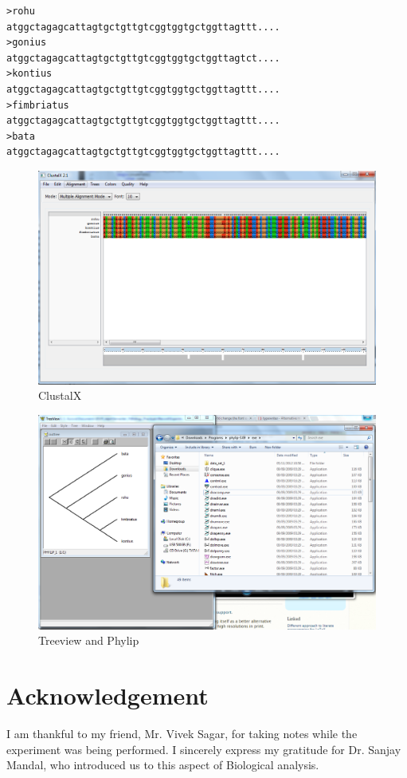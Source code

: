 \begin{lstlisting}[float,caption=Format of the source file,label=tree_sourcefile]
>rohu
atggctagagcattagtgctgttgtcggtggtgctggttagttt....
>gonius
atggctagagcattagtgctgttgtcggtggtgctggttagtct....
>kontius
atggctagagcattagtgctgttgtcggtggtgctggttagttt....
>fimbriatus
atggctagagcattagtgctgttgtcggtggtgctggttagttt....
>bata
atggctagagcattagtgctgttgtcggtggtgctggttagttt....
\end{lstlisting}

\begin{figure}[bth]
	\begin{center}
		\includegraphics[width=1.1\linewidth]{gfx/clustal}
	\end{center}
\caption[ClustalX]{ClustalX}
\label{clustal}
\end{figure}

\begin{figure}[bth]
	\begin{center}
		\includegraphics[width=1.2\linewidth]{gfx/tree}
	\end{center}
\caption[Treeview and Phylip]{Treeview and Phylip}
\label{tree}
\end{figure}


\section{Acknowledgement}
	I am thankful to my friend, Mr. Vivek Sagar, for taking notes while the experiment was being performed. I sincerely express my gratitude for Dr. Sanjay Mandal, who introduced us to this aspect of Biological analysis.